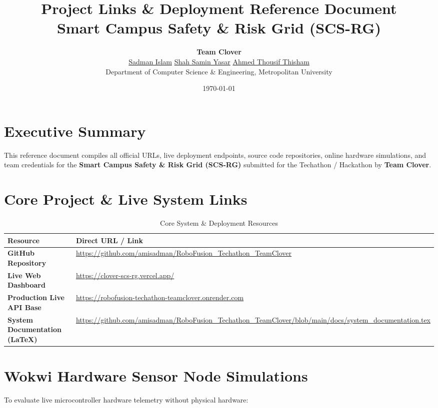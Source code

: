 \documentclass[11pt,a4paper]{article}
\title{\textbf{\Large Project Links \& Deployment Reference Document}\\
\vspace{0.2cm}
\Large Smart Campus Safety \& Risk Grid (SCS-RG)}
\author{\textbf{Team Clover}\\
\vspace{0.15cm}
\href{https://github.com/amisadman}{Sadman Islam} \quad \href{https://shahsaminyasar.vercel.app/}{Shah Samin Yasar} \quad \href{https://ahmedthousifportfolio.vercel.app/}{Ahmed Thousif Thisham}\\
Department of Computer Science \& Engineering, Metropolitan University}
\date{\today}
\begin{document}
\maketitle
\thispagestyle{empty}

\vspace{0.5cm}

\section*{Executive Summary}
This reference document compiles all official URLs, live deployment endpoints, source code repositories, online hardware simulations, and team credentials for the \textbf{Smart Campus Safety \& Risk Grid (SCS-RG)} submitted for the Techathon / Hackathon by \textbf{Team Clover}.

\vspace{0.5cm}

\section{Core Project \& Live System Links}

\begin{table}[h!]
\centering
\renewcommand{\arraystretch}{1.6}
\begin{tabularx}{\textwidth}{l X}
\toprule
\textbf{Resource} & \textbf{Direct URL / Link} \\
\midrule
\textbf{GitHub Repository} & \url{https://github.com/amisadman/RoboFusion_Techathon_TeamClover} \\
\textbf{Live Web Dashboard} & \url{https://clover-scs-rg.vercel.app/} \\
\textbf{Production Live API Base} & \url{https://robofusion-techathon-teamclover.onrender.com} \\
\textbf{System Documentation (LaTeX)} & \url{https://github.com/amisadman/RoboFusion_Techathon_TeamClover/blob/main/docs/system_documentation.tex} \\
\bottomrule
\end{tabularx}
\caption{Core System & Deployment Resources}
\end{table}

\vspace{0.5cm}

\section{Wokwi Hardware Sensor Node Simulations}

To evaluate live microcontroller hardware telemetry without physical hardware:
\end{document}

